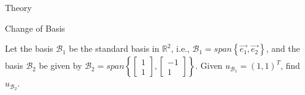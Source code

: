 \begin{section}{Theory}

\begin{homeworkSection}{Change of Basis}

Let the basis $\mathcal{B}_1$ be the standard basis in $\mathbb{R}^2$, i.e., $\mathcal{B}_1 = span \left \{ \Vec{e_1}, \Vec{e_2} \right \}$, 
and the basis $\mathcal{B}_2$ be given by 
 $\mathcal{B}_2 = span \left \{\begin{bmatrix}1 \\ 1\end{bmatrix} , \begin{bmatrix} -1 \\ 1\end{bmatrix} \right \}$. Given $u_{\mathcal{B}_1} = (1, 1)^T$, find $u_{\mathcal{B}_2}$.

\end{homeworkSection}

\end{section}

